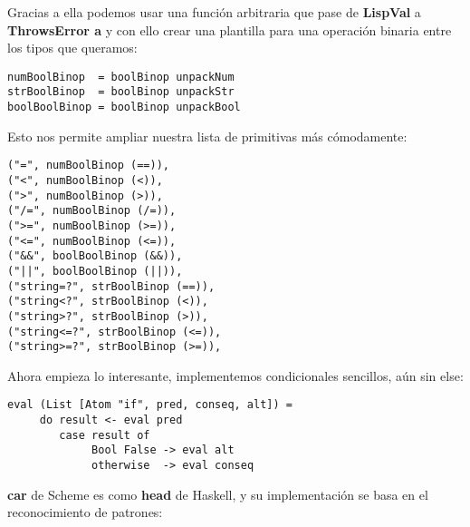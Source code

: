 Gracias a ella podemos usar una funci\'on arbitraria que pase de \textbf{LispVal} a \textbf{ThrowsError a} y con ello crear una plantilla para una operaci\'on binaria entre los tipos que queramos:\\

\begin{minipage}{\linewidth}
\begin{footnotesize}
\begin{lstlisting}[frame=single]
numBoolBinop  = boolBinop unpackNum
strBoolBinop  = boolBinop unpackStr
boolBoolBinop = boolBinop unpackBool
\end{lstlisting}
\end{footnotesize}
\end{minipage}

Esto nos permite ampliar nuestra lista de primitivas m\'as c\'omodamente:\\

\begin{minipage}{\linewidth}
\begin{footnotesize}
\begin{lstlisting}[frame=single]
("=", numBoolBinop (==)),
("<", numBoolBinop (<)),
(">", numBoolBinop (>)),
("/=", numBoolBinop (/=)),
(">=", numBoolBinop (>=)),
("<=", numBoolBinop (<=)),
("&&", boolBoolBinop (&&)),
("||", boolBoolBinop (||)),
("string=?", strBoolBinop (==)),
("string<?", strBoolBinop (<)),
("string>?", strBoolBinop (>)),
("string<=?", strBoolBinop (<=)),
("string>=?", strBoolBinop (>=)),
\end{lstlisting}
\end{footnotesize}
\end{minipage}

Ahora empieza lo interesante, implementemos condicionales sencillos, a\'un sin else:\\

\begin{minipage}{\linewidth}
\begin{footnotesize}
\begin{lstlisting}[frame=single]
eval (List [Atom "if", pred, conseq, alt]) = 
     do result <- eval pred
        case result of
             Bool False -> eval alt
             otherwise  -> eval conseq
\end{lstlisting}
\end{footnotesize}
\end{minipage}

\textbf{car} de Scheme es como \textbf{head} de Haskell, y su implementaci\'on se basa en el reconocimiento de patrones:\\

